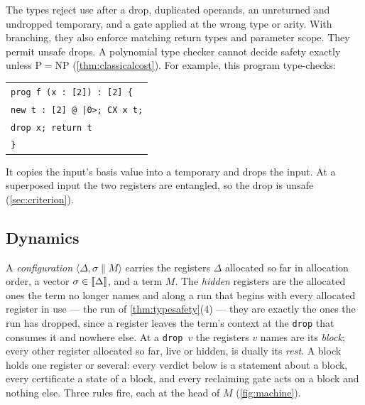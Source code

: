 \documentclass[acmsmall,screen,review,anonymous,nonacm]{acmart}
\begin{document}
The types reject use after a drop, duplicated operands, an unreturned
and undropped temporary, and a gate applied at the wrong type or arity.
With branching, they also enforce matching return types and parameter
scope. They permit unsafe drops. A polynomial type checker cannot decide
safety exactly unless $\mathrm P=\mathrm{NP}$ (\cref{thm:classicalcost}).
For example, this program type-checks:
\begin{center}
\begin{tabular}{@{}l@{}}
\texttt{prog f (x : [2]) : [2] \{}\\
\texttt{\quad new t : [2] @ |0>; CX x t;}\\
\texttt{\quad drop x; return t}\\
\texttt{\}}\\
\end{tabular}
\end{center}
It copies the input's basis value into a temporary and drops the input.
At a superposed input the two registers are entangled, so the drop is
unsafe (\cref{sec:criterion}).

\subsection{Dynamics}\label{sec:lang:dynamics}

A \emph{configuration} $\langle \Delta, \sigma \parallel M \rangle$ carries the
registers $\Delta$ allocated so far in allocation order, a vector $\sigma \in
[\![\Delta]\!]$, and a term $M$. The \emph{hidden} registers are the allocated ones the
term no longer names and along a run that begins with every allocated
register in use --- the run of \cref{thm:typesafety}(4) --- they are exactly the
ones the run has dropped, since a register leaves the term's context at the
\texttt{drop} that consumes it and nowhere else. At a \texttt{drop}~$v$ the
registers $v$ names are its \emph{block}; every other register allocated so far,
live or hidden, is dually its \emph{rest}. A block holds one register or
several: every verdict below is a statement about a block, every certificate a
state of a block, and every reclaiming gate acts on a block and nothing else.
Three rules fire, each at the head of $M$ (\cref{fig:machine}).
\end{document}
